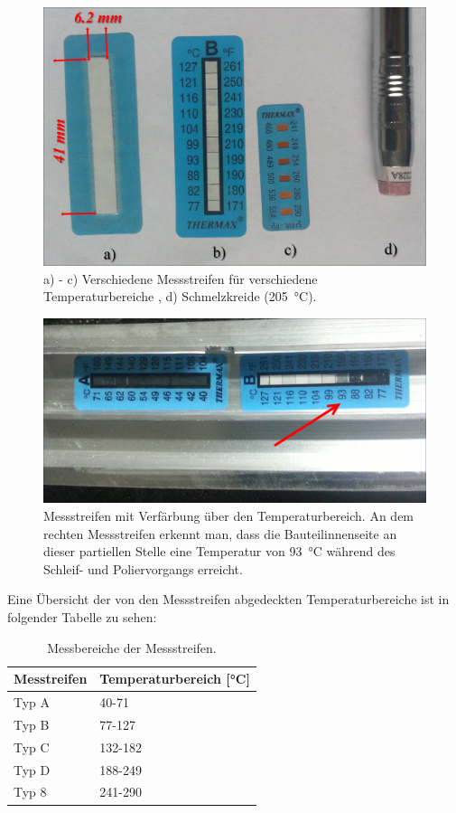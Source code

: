 \documentclass[12pt,a4paper,parskip,twoside,BCOR5mm,headsepline]{scrartcl}
\begin{document}
\begin{figure}[H]
\centering
\includegraphics[width=.8\textwidth]{messstreifen}
\caption{a) - c) Verschiedene Messstreifen für verschiedene Temperaturbereiche , d) Schmelzkreide (\SI{205}{\degreeCelsius}). }
\label{fig:messstreifen}
\end{figure}
\begin{figure}[H]
\centering
\includegraphics[width=.8\textwidth]{messaction}
\caption{Messstreifen mit Verfärbung über den Temperaturbereich. An dem rechten Messstreifen erkennt man, dass die Bauteilinnenseite an dieser partiellen Stelle eine Temperatur von \SI{93}{\degreeCelsius} während des Schleif- und Poliervorgangs erreicht. }
\label{fig:messaction}
\end{figure}

Eine Übersicht der von den  Messstreifen abgedeckten Temperaturbereiche ist in folgender Tabelle zu sehen:

\begin{table}[H]
\caption{Messbereiche der Messstreifen.}
\label{tab:messbereiche}
\centering
\begin{tabular}{ll}
\toprule
Messtreifen  & Temperaturbereich [\si{\degreeCelsius}]\\
\midrule
Typ A & 40-71\\
Typ B & 77-127\\
Typ C & 132-182\\
Typ D & 188-249\\
Typ 8 & 241-290\\
\bottomrule
\end{tabular}
\end{table}
\end{document}
